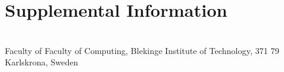 \documentclass[a4paper,twoside]{bth}
\newcommand{\faculty}{Faculty of Computing}
\begin{document}
\setcounter{page}{1}


\abstract

\clearpage
\acknowledgments
\noindent


\clearpage


\setcounter{secnumdepth}{3} %
\tableofcontents

\cleardoublepage
\pagestyle{headings}
















\appendix
\chapter{Supplemental Information}


\cleardoublepage
\thispagestyle{empty}
\vspace*{\fill}
\clearpage{\thispagestyle{empty}}
\changepage{3cm}{1cm}{-0.5cm}{-0.5cm}{}{-1.5cm}{}{}{}
\vspace*{\fill}
\center

{\bthcsnotextlogo{3cm}}
\\
\noindent\makebox[\linewidth]{\rule{\textwidth}{1pt}} 
Faculty of \faculty, Blekinge Institute of Technology, 371 79 Karlskrona, Sweden
\end{document}
